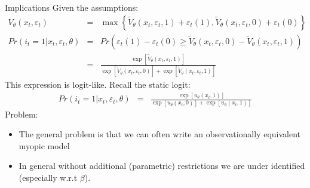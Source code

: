 \documentclass[xcolor=pdftex,dvipsnames,table,mathserif,aspectratio=169]{beamer}
\begin{document}
\begin{frame}{ Implications}
Given the assumptions:
\begin{eqnarray*}
V_{\theta}(x_t,\varepsilon_t) &=& \max \left\{ \tilde V_{\theta} (x_t, \varepsilon_t, 1) + \varepsilon_{t}(1) ,\tilde V_{\theta} (x_t, \varepsilon_t, 0) + \varepsilon_{t}(0) \right\}\\
Pr(i_t=1 | x_t,\varepsilon_t,\theta) &=& Pr\left(\varepsilon_{t}(1) - \varepsilon_{t}(0) \geq \tilde V_{\theta} (x_t, \varepsilon_t, 0) - \tilde V_{\theta} (x_t, \varepsilon_t, 1) \right) \\
&=& \frac {\exp[\tilde V_{\theta} (x_t, \varepsilon_t, 1)]  }{\exp[\tilde V_{\theta} (x_t, \varepsilon_t, 0)] + \exp[\tilde V_{\theta} (x_t, \varepsilon_t, 1)]} 
\end{eqnarray*}
This expression is logit-like. Recall the static logit:
\begin{eqnarray*}
Pr(i_t=1 | x_t,\varepsilon_t,\theta) &=& \frac {\exp[u_{\theta} (x_t, 1)]  }{\exp[u_{\theta} (x_t, 0)] + \exp[u_{\theta} (x_t, 1)]} 
\end{eqnarray*}
Problem:
\begin{itemize}
\item The general problem is that we can often write an observationally equivalent \alert{myopic model}
\item In general without additional (parametric) restrictions we are under identified (especially w.r.t $\beta$).
\end{itemize}
\end{frame}



\end{document}
